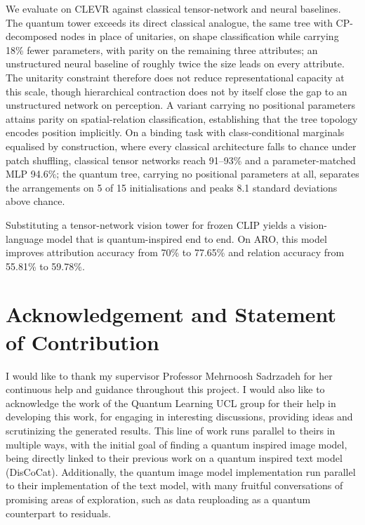 \documentclass[12pt, a4paper, oneside]{report}
\begin{document}
We evaluate on CLEVR against classical tensor-network and neural baselines. The quantum tower exceeds its direct classical analogue, the same tree with CP-decomposed nodes in place of unitaries, on shape classification while carrying 18\% fewer parameters, with parity on the remaining three attributes; an unstructured neural baseline of roughly twice the size leads on every attribute. The unitarity constraint therefore does not reduce representational capacity at this scale, though hierarchical contraction does not by itself close the gap to an unstructured network on perception. A variant carrying no positional parameters attains parity on spatial-relation classification, establishing that the tree topology encodes position implicitly. On a binding task with class-conditional marginals equalised by construction, where every classical architecture falls to chance under patch shuffling, classical tensor networks reach 91–93\% and a parameter-matched MLP 94.6\%; the quantum tree, carrying no positional parameters at all, separates the arrangements on 5 of 15 initialisations and peaks 8.1 standard deviations above chance.

Substituting a tensor-network vision tower for frozen CLIP yields a vision-language model that is quantum-inspired end to end. On ARO, this model improves attribution accuracy from 70\% to 77.65\% and relation accuracy from 55.81\% to 59.78\%.
    
    
\newpage

\tableofcontents
\newpage

\chapter*{Acknowledgement and Statement of Contribution}

I would like to thank my supervisor Professor Mehrnoosh Sadrzadeh for her continuous help and guidance throughout this  project. I would also like to acknowledge the work of the Quantum Learning UCL group for their help in developing this work, for engaging in interesting discussions, providing ideas and scrutinizing the generated results. 
This line of work runs parallel to theirs in multiple ways, with the initial goal of finding a quantum inspired image model, being directly linked to their previous work on a quantum inspired text model (DisCoCat). Additionally, the quantum image model implementation run parallel to their implementation of the text model, with many fruitful conversations of promising areas of exploration, such as data reuploading as a quantum counterpart to residuals. 
\end{document}
